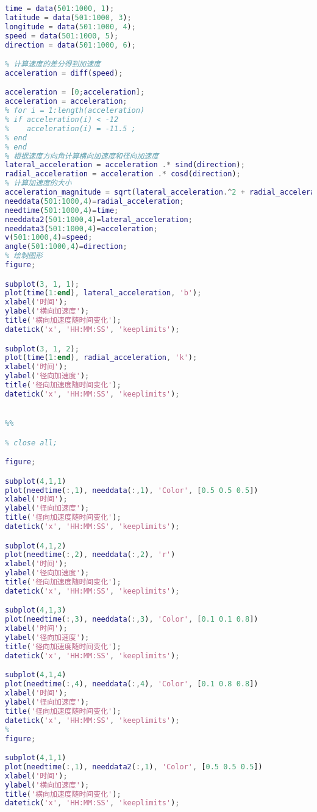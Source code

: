 \documentclass[withoutpreface,bwprint]{cumcmthesis} %
\begin{document}
\begin{appendices}
\begin{lstlisting}[language=matlab]
% 假设数据的列顺序是：时间、纬度、经度、速度、速度方向角
time = data(501:1000, 1);
latitude = data(501:1000, 3);
longitude = data(501:1000, 4);
speed = data(501:1000, 5);
direction = data(501:1000, 6);

% 计算速度的差分得到加速度
acceleration = diff(speed);

acceleration = [0;acceleration];
acceleration = acceleration;
% for i = 1:length(acceleration)
% if acceleration(i) < -12
%    acceleration(i) = -11.5 ; 
% end
% end
% 根据速度方向角计算横向加速度和径向加速度
lateral_acceleration = acceleration .* sind(direction);
radial_acceleration = acceleration .* cosd(direction);
% 计算加速度的大小
acceleration_magnitude = sqrt(lateral_acceleration.^2 + radial_acceleration.^2);
needdata(501:1000,4)=radial_acceleration;
needtime(501:1000,4)=time;
needdata2(501:1000,4)=lateral_acceleration;
needdata3(501:1000,4)=acceleration;
v(501:1000,4)=speed;
angle(501:1000,4)=direction;
% 绘制图形
figure;

subplot(3, 1, 1);
plot(time(1:end), lateral_acceleration, 'b');
xlabel('时间');
ylabel('横向加速度');
title('横向加速度随时间变化');
datetick('x', 'HH:MM:SS', 'keeplimits');

subplot(3, 1, 2);
plot(time(1:end), radial_acceleration, 'k');
xlabel('时间');
ylabel('径向加速度');
title('径向加速度随时间变化');
datetick('x', 'HH:MM:SS', 'keeplimits');


%%

% close all;

figure;

subplot(4,1,1)
plot(needtime(:,1), needdata(:,1), 'Color', [0.5 0.5 0.5])
xlabel('时间');
ylabel('径向加速度');
title('径向加速度随时间变化');
datetick('x', 'HH:MM:SS', 'keeplimits');

subplot(4,1,2)
plot(needtime(:,2), needdata(:,2), 'r')
xlabel('时间');
ylabel('径向加速度');
title('径向加速度随时间变化');
datetick('x', 'HH:MM:SS', 'keeplimits');

subplot(4,1,3)
plot(needtime(:,3), needdata(:,3), 'Color', [0.1 0.1 0.8])
xlabel('时间');
ylabel('径向加速度');
title('径向加速度随时间变化');
datetick('x', 'HH:MM:SS', 'keeplimits');

subplot(4,1,4)
plot(needtime(:,4), needdata(:,4), 'Color', [0.1 0.8 0.8])
xlabel('时间');
ylabel('径向加速度');
title('径向加速度随时间变化');
datetick('x', 'HH:MM:SS', 'keeplimits');
%
figure;

subplot(4,1,1)
plot(needtime(:,1), needdata2(:,1), 'Color', [0.5 0.5 0.5])
xlabel('时间');
ylabel('横向加速度');
title('横向加速度随时间变化');
datetick('x', 'HH:MM:SS', 'keeplimits');


\end{lstlisting}
\end{appendices}
\end{document}
